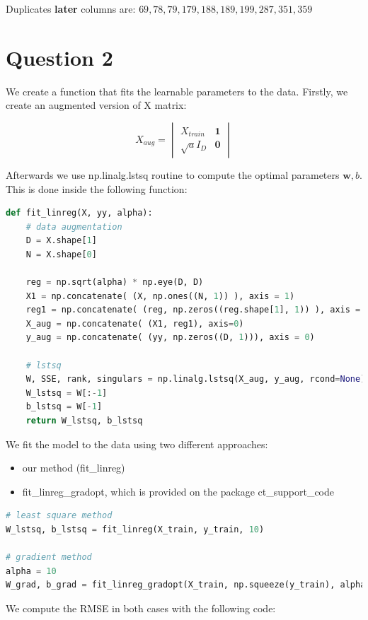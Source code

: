 \documentclass{article}
\begin{document}
Duplicates \textbf{later} columns are: $ {69,  78,  79, 179, 188, 189, 199, 287, 351, 359} $


\section*{Question 2}

We create a function that fits the learnable parameters to the data. Firstly, we create an augmented version of X matrix:

$$ \displaystyle
X_{aug} = \begin{vmatrix}
    X_{train} & \textbf{1} \\
    \sqrt{a}I_D & \textbf{0} 
\end{vmatrix}
$$

Afterwards we use np.linalg.lstsq routine to compute the optimal parameters $\textbf{w}, b$. This is done inside the following function:

\begin{lstlisting}[language= Python]
def fit_linreg(X, yy, alpha):
    # data augmentation
    D = X.shape[1]
    N = X.shape[0]
    
    reg = np.sqrt(alpha) * np.eye(D, D)
    X1 = np.concatenate( (X, np.ones((N, 1)) ), axis = 1)
    reg1 = np.concatenate( (reg, np.zeros((reg.shape[1], 1)) ), axis = 1)
    X_aug = np.concatenate( (X1, reg1), axis=0)
    y_aug = np.concatenate( (yy, np.zeros((D, 1))), axis = 0)

    # lstsq
    W, SSE, rank, singulars = np.linalg.lstsq(X_aug, y_aug, rcond=None)
    W_lstsq = W[:-1]
    b_lstsq = W[-1]
    return W_lstsq, b_lstsq
\end{lstlisting}

We fit the model to the data using two different approaches:
\begin{itemize}
    \item our method (fit\_linreg) 
    \item fit\_linreg\_gradopt, which is provided on the package ct\_support\_code
\end{itemize}

\begin{lstlisting}[language= Python]
# least square method
W_lstsq, b_lstsq = fit_linreg(X_train, y_train, 10)

# gradient method
alpha = 10
W_grad, b_grad = fit_linreg_gradopt(X_train, np.squeeze(y_train), alpha)
\end{lstlisting}

We compute the RMSE in both cases with the following code:
\end{document}
